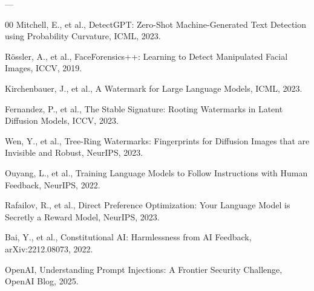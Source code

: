 ––\documentclass[preprint,12pt]{elsarticle}
\begin{document}
\begin{thebibliography}{00}
  Mitchell, E., et al.,
  DetectGPT: Zero-Shot Machine-Generated Text Detection using Probability Curvature,
  ICML, 2023.

  R{\"o}ssler, A., et al.,
  FaceForensics++: Learning to Detect Manipulated Facial Images,
  ICCV, 2019.

  Kirchenbauer, J., et al.,
  A Watermark for Large Language Models,
  ICML, 2023.

  Fernandez, P., et al.,
  The Stable Signature: Rooting Watermarks in Latent Diffusion Models,
  ICCV, 2023.

  Wen, Y., et al.,
  Tree-Ring Watermarks: Fingerprints for Diffusion Images that are Invisible and Robust,
  NeurIPS, 2023.

  Ouyang, L., et al.,
  Training Language Models to Follow Instructions with Human Feedback,
  NeurIPS, 2022.

  Rafailov, R., et al.,
  Direct Preference Optimization: Your Language Model is Secretly a Reward Model,
  NeurIPS, 2023.

  Bai, Y., et al.,
  Constitutional AI: Harmlessness from AI Feedback,
  arXiv:2212.08073, 2022.

  OpenAI,
  Understanding Prompt Injections: A Frontier Security Challenge,
  OpenAI Blog, 2025.

\end{thebibliography}
\end{document}
